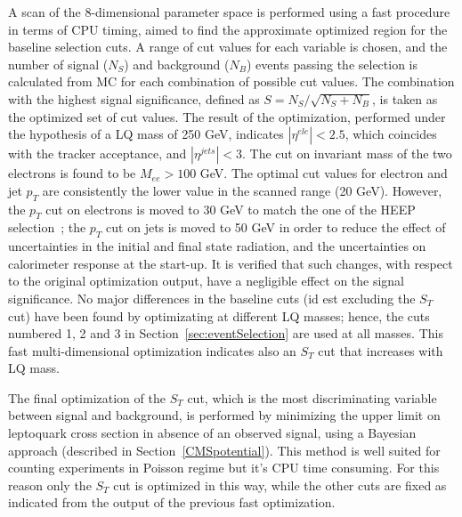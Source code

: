 A scan of the 8-dimensional parameter space is performed using a fast procedure in terms of CPU timing, 
aimed to find the approximate optimized region for the baseline selection cuts.
A range of cut values for each variable is chosen, and the number of signal ($N_S$) 
and background ($N_B$) events passing the selection is calculated from MC for each combination 
of possible cut values. The combination with the highest signal significance, 
defined as $S = N_S/\sqrt{N_S+N_B}$, is taken as the optimized set of cut values. %
The result of the optimization, performed under the hypothesis of a LQ mass of 250 GeV, 
indicates $|\eta^{ele}|<2.5$, which coincides with the tracker acceptance,
and $|\eta^{jets}|<3$. The cut on invariant mass of the two electrons is found to be $M_{ee}>100$ GeV. The 
optimal cut values for electron and jet $p_T$ are consistently the lower value in the scanned range 
(20 GeV). However, the $p_{T}$ cut on electrons is moved to 30 GeV to match the one of the HEEP 
selection~\cite{HEEPNOTE}; %
the $p_{T}$ cut on jets is moved to 50 GeV in order to reduce the effect 
of uncertainties in the initial and final state radiation, and the uncertainties 
on calorimeter response at the start-up. It is verified that such changes, with respect to the original 
optimization output, have a negligible effect on the signal significance. 
No major differences in the baseline cuts (id est excluding the $S_T$ cut) have been found by optimizating 
at different LQ masses; hence, the cuts numbered 1, 2 and 3 in Section~\ref{sec:eventSelection} 
are used at all masses.
This fast multi-dimensional optimization indicates also an $S_T$ cut that increases with LQ mass. 

The final optimization of the $S_T$ cut, which is the most discriminating variable between 
signal and background, is performed by minimizing the upper limit on 
leptoquark cross section in absence of an observed signal, 
using a Bayesian approach (described in Section~\ref{CMSpotential}). 
This method is well suited for counting experiments in Poisson regime but it's CPU time consuming. 
For this reason only the $S_T$ cut is optimized in this way, while the other cuts are fixed as indicated from 
the output of the previous fast optimization.

